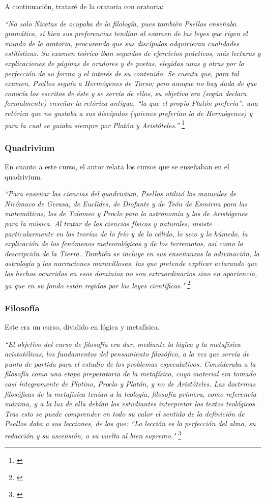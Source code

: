 A continuación, trataré de la oratoria con oratoria:

\textit{“No solo Nicetas de ocupaba de la filología, pues también Psellos 
enseñaba gramática, si bien sus preferencias tendían al examen de 
las leyes que rigen el mundo de la oratoria, procurando que sus discípulos 
adquirieran cualidades estilísticas. Su examen teórico iban seguidos 
de ejercicios prácticos, más lecturas y explicaciones de páginas 
de oradores y de poetas, elegidas unas y otras por la perfección de 
su forma y el interés de su contenido. Se cuenta que, para tal examen, 
Psellos seguía a Hermógenes de Tarso; pero aunque no hay duda de 
que conocía los escritos de éste y se servía de ellos, su objetivo era 
(según declara formalmente) enseñar la retórica antigua, 
“la que el propio Platón prefería”, una retórica que no gustaba a 
sus discípulos (quienes preferían la de Hermógenes) y para la cual 
se guiaba siempre por Platón y Aristóteles.”}
\footnote{\cite[p.~163]{filosofia}}

\subsubsection{Quadrivium}
En cuanto a este curso, el autor relata los cursos 
que se enseñaban en el quadrivium.

\textit{“Para enseñar las ciencias del quadrivium, Psellos utilizó los 
manuales de Nicómaco de Gerasa, de Euclides, de Diofante y de 
Teón de Esmirna para las matemáticas, los de Tolomeo y Proclo para la 
astronomía y los de Aristógenes para la música. 
Al tratar de las ciencias físicas y naturales, insiste particularmente 
en las teorías de lo frío y de lo cálido, lo seco y lo húmedo, 
la explicación de los fenómenos meteorológicos y de los terremotos, 
así como la descripción de la Tierra. 
También se incluye en sus enseñanzas la adivinación, 
la astrología y las narraciones maravillosas, 
las que pretende explicar aclarando que los hechos ocurridos en esos 
dominios no son extraordinarios sino en apariencia, 
ya que en su fondo están regidos por las leyes científicas."}
\footnote{\cite[p.~163]{filosofia}}

\subsubsection{Filosofía}
Este era un curso, dividido en lógica y metafísica.

\textit{“El objetivo del curso de filosofía era dar, mediante la lógica y 
la metafísica aristotélicas, los fundamentos del pensamiento 
filosófico, a la vez que servía de punto de partida para el 
estudio de los problemas especulativos. Consideraba a la filosofía 
como una etapa preparatoria de la metafísica, cuyo material era tomado 
casi íntegramente de Plotino, Proclo y Platón, y no de Aristóteles. 
Las doctrinas filosóficas de la metafísica tenían a la teología, 
filosofía primera, como referencia máxima, y a la luz de ella debían 
los estudiantes interpretar los textos teológicos. 
Tras esto se puede comprender en todo su valor el sentido de la 
definición de Psellos daba a sus lecciones, de las que: 
“La lección es la perfección del alma, su redacción y su ascensión, 
o su vuelta al bien supremo."}
\footnote{\cite[pp.~164--165]{filosofia}}

